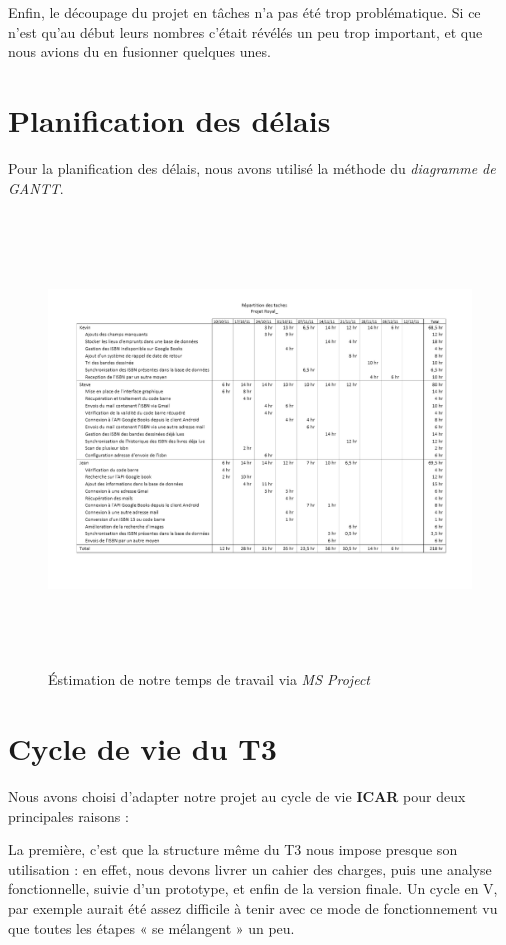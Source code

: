 Enfin, le découpage du projet en tâches n'a pas été trop problématique. 
Si ce n'est qu'au début leurs nombres c'était révélés un peu trop important,
et que nous avions du en fusionner quelques unes. 

\section{Planification des délais}

Pour la planification des délais, nous avons utilisé la méthode du \emph{diagramme de GANTT}.
\begin{figure}[h]
\begin{center}
\includegraphics[height=12cm]{../repartition_des_taches.png}
\end{center}
\caption{Éstimation de notre temps de travail via \emph{MS Project}}
\end{figure}

\section{Cycle de vie du T3}
Nous avons choisi d'adapter notre projet au cycle de vie \textbf{ICAR} pour deux principales raisons : 

La première, c'est que la structure même du T3 nous impose presque son utilisation :
en effet, nous devons livrer un cahier des charges, puis une analyse fonctionnelle, suivie d'un prototype, et enfin de la version finale. 
Un cycle en V, par exemple aurait été assez difficile à tenir avec ce mode de fonctionnement vu que toutes les étapes « se mélangent » un peu. 

